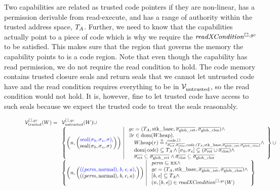 \begin{jversion}
Two capabilities are related as trusted code pointers if they are non-linear, has a permission derivable from read-execute, and has a range of authority within the trusted address space, $\ta$.
Further, we need to know that the capabilities actually point to a piece of code which is why we require the $\xReadCond{}$ to be satisfied.
This makes sure that the region that governs the memory the capability points to is a code region.
Note that even though the capability has read permission, we do not require the read condition to hold.
The code memory contains trusted closure seals and return seals that we cannot let untrusted code have and the read condition requires everything to be in $\lrv[]$, so the read condition would not hold.
It is, however, fine to let trusted code have access to such seals because we expect the trusted code to treat the seals reasonably.
\begin{figure}
  \centering
  \[
  \lrvtrusted[\square,\gc](W) =
  \begin{array}[t]{l}
    \lrv(W)\cup \\
%
    \left\{ \npair{\left(\arraycolsep=0pt\array{l} \src{\seal{\sigma_\baddr,\sigma_\eaddr,\sigma}},\\ \seal{\sigma_\baddr,\sigma_\eaddr,\sigma} \endarray \right)} 
    \; \middle| \;
    \begin{array}{l}
      \gc = (\ta,\stkb,\gsigrets,\gsigcloss)  \wedge \\
      \exists r \in \dom(\pwheap) \ldotp \\
      \quad \pwheap(r) \nequal \codereg{\sigrets,\sigcloss,\code,(\ta,\stkb,\gsigrets,\gsigcloss)} \wedge\\
      \quad \dom(\code) \subseteq \ta \wedge [\sigma_\baddr,\sigma_\eaddr] \subseteq (\sigrets\cup\sigcloss) \wedge\\
      \quad \sigrets \subseteq \gsigrets \wedge \sigcloss \subseteq \gsigcloss
    \end{array}
    \right\} \cup \\
    \left\{ \npair{\left(\arraycolsep=0pt\array{l} \src{((\perm,\normal),\baddr,\eaddr,\aaddr)},\\ ((\perm,\normal),\baddr,\eaddr,\aaddr) \endarray \right)} \;\middle|\; 
    \begin{array}{l}
      \perm \sqsubseteq \rx \wedge \\
      \gc = (\ta,\stkb,\gsigrets,\gsigcloss)  \wedge \\
      {} [\baddr,\eaddr] \subseteq \ta \wedge\\
      \npair{[\baddr,\eaddr]} \in \xReadCond[\square,\gc]{W} 
    \end{array}
    \right\}
  \end{array}
\]


\end{figure}
\end{jversion}
